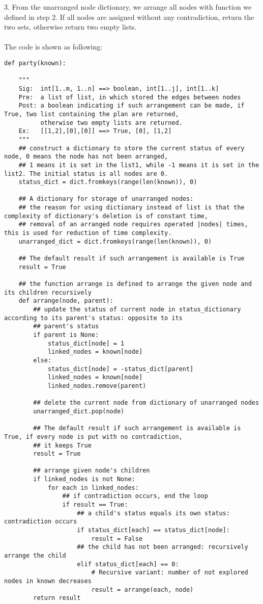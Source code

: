 \documentclass[a4paper,11pt]{article}
\begin{document}
3. From the unarranged node dictionary, we arrange all nodes with function we defined in step 2. If all nodes are assigned without any contradiction, return the two sets, otherwise return two empty lists. \\\\
The code is shown as following: 
\begin{lstlisting}
def party(known):

    """
    Sig:  int[1..m, 1..n] ==> boolean, int[1..j], int[1..k]
    Pre:  a list of list, in which stored the edges between nodes
    Post: a boolean indicating if such arrangement can be made, if True, two list containing the plan are returned,
          otherwise two empty lists are returned.
    Ex:   [[1,2],[0],[0]] ==> True, [0], [1,2]
    """
    ## construct a dictionary to store the current status of every node, 0 means the node has not been arranged,
    ## 1 means it is set in the list1, while -1 means it is set in the list2. The initial status is all nodes are 0.
    status_dict = dict.fromkeys(range(len(known)), 0)

    ## A dictionary for storage of unarranged nodes:
    ## the reason for using dictionary instead of list is that the complexity of dictionary's deletion is of constant time,
    ## removal of an arranged node requires operated |nodes| times, this is used for reduction of time complexity.
    unarranged_dict = dict.fromkeys(range(len(known)), 0)

    ## The default result if such arrangement is available is True
    result = True

    ## the function arrange is defined to arrange the given node and its children recursively
    def arrange(node, parent):
        ## update the status of current node in status_dictionary according to its parent's status: opposite to its
        ## parent's status
        if parent is None:
            status_dict[node] = 1
            linked_nodes = known[node]
        else:
            status_dict[node] = -status_dict[parent]
            linked_nodes = known[node]
            linked_nodes.remove(parent)

        ## delete the current node from dictionary of unarranged nodes
        unarranged_dict.pop(node)

        ## The default result if such arrangement is available is True, if every node is put with no contradiction,
        ## it keeps True
        result = True

        ## arrange given node's children
        if linked_nodes is not None:
            for each in linked_nodes:
                ## if contradiction occurs, end the loop
                if result == True:
                    ## a child's status equals its own status: contradiction occurs
                    if status_dict[each] == status_dict[node]:
                        result = False
                    ## the child has not been arranged: recursively arrange the child
                    elif status_dict[each] == 0:
                        # Recursive variant: number of not explored nodes in known decreases
                        result = arrange(each, node)
        return result


\end{lstlisting}
\end{document}
